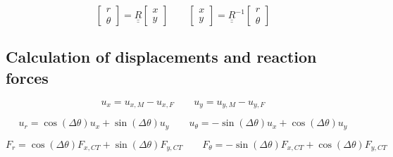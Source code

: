\documentclass[a4paper]{jpconf}
\begin{document}
\begin{equation}
\begin{bmatrix}
r \\
\theta
\end{bmatrix}=\underline{\underline{R}}\begin{bmatrix}
x \\
y
\end{bmatrix}\qquad\begin{bmatrix}
x \\
y
\end{bmatrix}=\underline{\underline{R}}^{-1}\begin{bmatrix}
r \\
\theta
\end{bmatrix}
\end{equation}

\subsection{Calculation of displacements and reaction forces}

\begin{equation}
u_{x}=u_{x,M}-u_{x,F}\qquad u_{y}=u_{y,M}-u_{y,F}
\end{equation}

\begin{equation}
u_{r}=\cos\left(\Delta\theta\right) u_{x}+\sin\left(\Delta\theta\right) u_{y}\qquad u_{\theta}=-\sin\left(\Delta\theta\right) u_{x}+\cos\left(\Delta\theta\right) u_{y}
\end{equation}

\begin{equation}
F_{r}=\cos\left(\Delta\theta\right) F_{x,CT}+\sin\left(\Delta\theta\right) F_{y,CT}\qquad F_{\theta}=-\sin\left(\Delta\theta\right) F_{x,CT}+\cos\left(\Delta\theta\right) F_{y,CT}
\end{equation}
\end{document}
